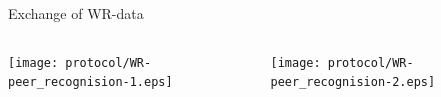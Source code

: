 \documentclass[compress,red]{beamer}
\begin{document}
% 
% 
% 
% 
% 
% 
% 
\begin{frame}{Exchange of WR-data}

  \begin{columns}[c]

    \begin{center}
    \texttt{[image: protocol/WR-peer\_recognision-1.eps]}
    \end{center}


    \begin{center}
    \texttt{[image: protocol/WR-peer\_recognision-2.eps]}
    \end{center}

  \end{columns}

\end{frame}
\end{document}
